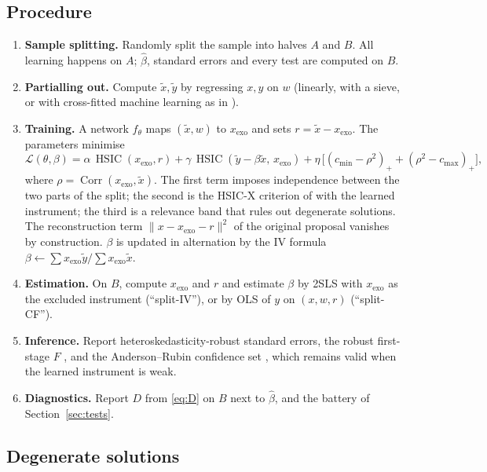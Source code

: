 \documentclass[11pt]{article}
\theoremstyle{definition}
\theoremstyle{remark}
\newcommand{\Corr}{\operatorname{Corr}}
\newcommand{\HSIC}{\operatorname{HSIC}}
\newcommand{\xexo}{x_{\mathrm{exo}}}
\newcommand{\tx}{\tilde{x}}
\newcommand{\ty}{\tilde{y}}
\begin{document}
\subsection{Procedure}

\begin{enumerate}[label=\textbf{Step \arabic*.},leftmargin=*]
  \item \textbf{Sample splitting.} Randomly split the sample into halves $A$ and $B$. All learning
  happens on $A$; $\hat\beta$, standard errors and every test are computed on $B$.
  \item \textbf{Partialling out.} Compute $\tx,\ty$ by regressing $x,y$ on $w$ (linearly, with a
  sieve, or with cross-fitted machine learning as in \citealp{chernozhukov2018}).
  \item \textbf{Training.} A network $f_\theta$ maps $(\tx, w)$ to $\xexo$ and sets
  $r = \tx - \xexo$. The parameters minimise
  \begin{equation}\label{eq:loss}
  \mathcal{L}(\theta,\beta) = \alpha\,\HSIC(\xexo, r)
     + \gamma\,\HSIC(\ty - \beta\tx,\, \xexo)
     + \eta\,\big[(c_{\min} - \rho^2)_+ + (\rho^2 - c_{\max})_+\big],
  \end{equation}
  where $\rho = \Corr(\xexo,\tx)$. The first term imposes independence between the two parts of the
  split; the second is the HSIC-X criterion of \citet{saengkyongam2022} with the learned
  instrument; the third is a relevance band that rules out degenerate solutions. The
  reconstruction term $\|x - \xexo - r\|^2$ of the original proposal vanishes by construction.
  $\beta$ is updated in alternation by the IV formula
  $\beta \leftarrow \sum \xexo\ty / \sum\xexo\tx$.
  \item \textbf{Estimation.} On $B$, compute $\xexo$ and $r$ and estimate $\beta$ by 2SLS with
  $\xexo$ as the excluded instrument (``split-IV''), or by OLS of $y$ on $(x,w,r)$ (``split-CF'').
  \item \textbf{Inference.} Report heteroskedasticity-robust standard errors, the robust
  first-stage $F$ \citep{montielolea2013}, and the Anderson--Rubin confidence set
  \citep{andersonrubin1949}, which remains valid when the learned instrument is weak.
  \item \textbf{Diagnostics.} Report $D$ from \eqref{eq:D} on $B$ next to $\hat\beta$, and the
  battery of Section~\ref{sec:tests}.
\end{enumerate}

\subsection{Degenerate solutions}
\end{document}
